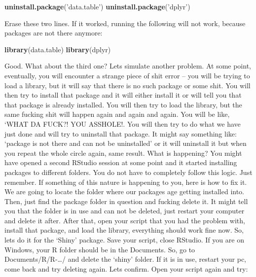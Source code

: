 \documentclass[]{book}
\newenvironment{Shaded}{\begin{snugshade}}{\end{snugshade}}
\newcommand{\KeywordTok}[1]{\textcolor[rgb]{0.13,0.29,0.53}{\textbf{#1}}}
\newcommand{\NormalTok}[1]{#1}
\newcommand{\StringTok}[1]{\textcolor[rgb]{0.31,0.60,0.02}{#1}}
\begin{document}
\begin{Shaded}
\begin{Highlighting}[]
\KeywordTok{uninstall.package}\NormalTok{(}\StringTok{'data.table'}\NormalTok{)}
\KeywordTok{uninstall.package}\NormalTok{(}\StringTok{'dplyr'}\NormalTok{)}
\end{Highlighting}
\end{Shaded}

Erase these two lines. If it worked, running the following will not work, because packages are not there anymore:

\begin{Shaded}
\begin{Highlighting}[]
\KeywordTok{library}\NormalTok{(data.table)}
\KeywordTok{library}\NormalTok{(dplyr)}
\end{Highlighting}
\end{Shaded}

Good. What about the third one? Lets simulate another problem. At some point, eventually, you will encounter a strange piece of shit error -- you will be trying to load a library, but it will say that there is no such package or some shit. You will then try to install that package and it will either install it or will tell you that that package is already installed. You will then try to load the library, but the same fucking shit will happen again and again and again. You will be like, `WHAT DA FUCK?! YOU ASSHOLE!. You will then try to do what we have just done and will try to uninstall that package. It might say something like: `package is not there and can not be uninstalled' or it will uninstall it but when you repeat the whole circle again, same result. What is happening? You might have opened a second RStudio session at some point and it started installing packages to different folders. You do not have to completely follow this logic. Just remember. If something of this nature is happening to you, here is how to fix it. We are going to locate the folder where our packages age getting installed into. Then, just find the package folder in question and fucking delete it. It might tell you that the folder is in use and can not be deleted, just restart your computer and delete it after. After that, open your script that you had the problem with, install that package, and load the library, everything should work fine now. So, lets do it for the `Shiny' package. Save your script, close RStudio. If you are on Windows, your R folder should be in the Documents. So, go to Documents/R/R-\ldots{}/ and delete the `shiny' folder. If it is in use, restart your pc, come back and try deleting again. Lets confirm. Open your script again and try:
\end{document}
